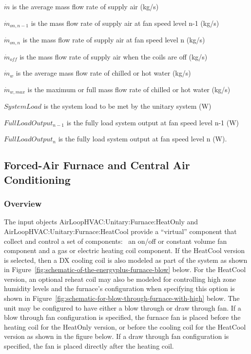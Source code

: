 $\dot{m}$ is the average mass flow rate of supply air (kg/s)

$\dot{m}_{on, n-1}$ is the mass flow rate of supply air at fan speed level n-1 (kg/s)

$\dot{m}_{on, n}$ is the mass flow rate of supply air at fan speed level n (kg/s)

$\dot{m}_{off}$ is the mass flow rate of supply air when the coils are off (kg/s)

$\dot{m}_{w}$ is the average mass flow rate of chilled or hot water (kg/s)

$\dot{m}_{w, max}$ is the maximum or full mass flow rate of chilled or hot water (kg/s)

$SystemLoad$ is the system load to be met by the unitary system (W)

$FullLoadOutput_{n-1}$ is the fully load system output at fan speed level n-1 (W)

$FullLoadOutput_{n}$ is the fully load system output at fan speed level n (W).

\subsection{Forced-Air Furnace and Central Air Conditioning}\label{forced-air-furnace-and-central-air-conditioning}

\subsubsection{Overview}\label{overview-1}

The input objects AirLoopHVAC:Unitary:Furnace:HeatOnly and \\
AirLoopHVAC:Unitary:Furnace:HeatCool provide a ``virtual'' component that collect and control a set of components:~ an on/off or constant volume fan component and a gas or electric heating coil component. If the HeatCool version is selected, then a DX cooling coil is also modeled as part of the system as shown in Figure~\ref{fig:schematic-of-the-energyplus-furnace-blow} below. For the HeatCool version, an optional reheat coil may also be modeled for controlling high zone humidity levels and the furnace's configuration when specifying this option is shown in Figure~\ref{fig:schematic-for-blow-through-furnace-with-high} below. The unit may be configured to have either a blow through or draw through fan. If a blow through fan configuration is specified, the furnace fan is placed before the heating coil for the HeatOnly version, or before the cooling coil for the HeatCool version as shown in the figure below. If a draw through fan configuration is specified, the fan is placed directly after the heating coil.

